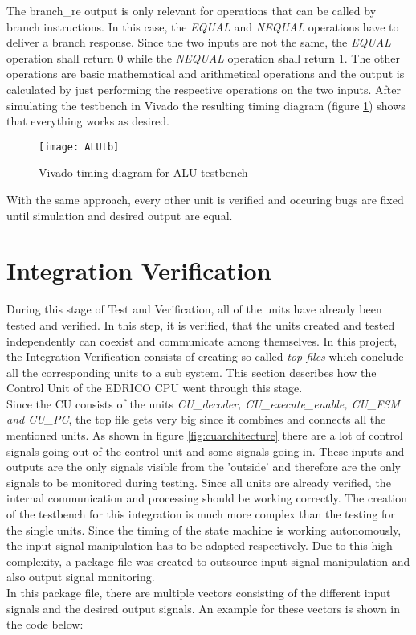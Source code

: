 The branch\_re output is only relevant for operations that can be called by branch instructions. In this case, the \textit{EQUAL} and \textit{NEQUAL} operations have to deliver a branch response. Since the two inputs are not the same, the \textit{EQUAL} operation shall return 0 while the \textit{NEQUAL} operation shall return 1. The other operations are basic mathematical and arithmetical operations and the output is calculated by just performing the respective operations on the two inputs. After simulating the testbench in Vivado the resulting timing diagram (figure \ref{fig:alutb}) shows that everything works as desired. 
\begin{figure}[H]
	\centering
	\texttt{[image: ALUtb]}
	\caption{Vivado timing diagram for ALU testbench}
	\label{fig:alutb}
\end{figure}
With the same approach, every other unit is verified and occuring bugs are fixed until simulation and desired output are equal.
\section{Integration Verification}
During this stage of Test and Verification, all of the units have already been tested and verified. In this step, it is verified, that the units created and tested independently can coexist and communicate among themselves. In this project, the Integration Verification consists of creating so called \textit{top-files} which conclude all the corresponding units to a sub system. This section describes how the Control Unit of the EDRICO CPU went through this stage.\\
Since the CU consists of the units \textit{CU\_decoder, CU\_execute\_enable, CU\_FSM and CU\_PC}, the top file gets very big since it combines and connects all the mentioned units. As shown in figure \ref{fig:cuarchitecture} there are a lot of control signals going out of the control unit and some signals going in. These inputs and outputs are the only signals visible from the 'outside' and therefore are the only signals to be monitored during testing. Since all units are already verified, the internal communication and processing should be working correctly. The creation of the testbench for this integration is much more complex than the testing for the single units. Since the timing of the state machine is working autonomously, the input signal manipulation has to be adapted respectively. Due to this high complexity, a package file was created to outsource input signal manipulation and also output signal monitoring.\\
In this package file, there are multiple vectors consisting of the different input signals and the desired output signals. An example for these vectors is shown in the code below:\clearpage


